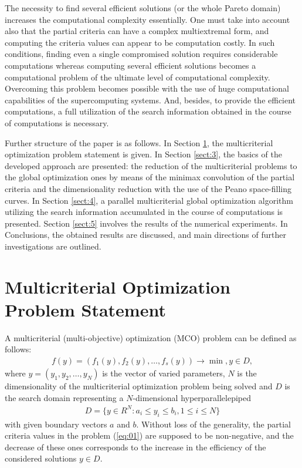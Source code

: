 \documentclass[procedia]{easychair}
\begin{document}
The necessity to find several efficient solutions (or the whole Pareto domain) increases the computational complexity essentially. One must take into account also that the partial criteria can have a complex multiextremal form, and computing the criteria values can appear to be computation costly. In such conditions, finding even a single compromised solution requires considerable computations whereas computing several efficient solutions becomes a computational problem of the ultimate level of computational complexity. Overcoming this problem becomes possible with the use of huge computational capabilities of the supercomputing systems. And, besides, to provide the efficient computations, a full utilization of the search information obtained in the course of computations is necessary. \par

Further structure of the paper is as follows. In Section \ref{sect:2}, the multicriterial optimization problem statement is given. In Section \ref{sect:3}, the basics of the developed approach are presented: the reduction of the multicriterial problems to the global optimization ones by means of the minimax convolution of the partial criteria and the dimensionality reduction with the use of the Peano space-filling curves. In Section \ref{sect:4}, a parallel multicriterial global optimization algorithm utilizing the search information accumulated in the course of computations is presented. Section \ref{sect:5} involves the results of the numerical experiments. In Conclusions, the obtained results are discussed, and main directions of further investigations are outlined.


\section{Multicriterial Optimization Problem Statement}
\label{sect:2}
A multicriterial (multi-objective) optimization (MCO) problem can be defined as follows:
\begin{eqnarray} \label{eq:01}
f(y) = (f_1(y), f_2(y),\dots, f_s(y)) \to \min,  y \in D,
\end{eqnarray}
where $y = (y_1, y_2, \dots , y_N)$ is the vector of varied parameters, $N$ is the dimensionality of the multicriterial optimization problem being solved and $D$ is the search domain representing a $N$-dimensional hyperparallelepiped 
\begin{eqnarray*}
D  = \{ y \in R^N: a_i \leq y_i \leq b_i, 1 \leq i \leq N \}
\end{eqnarray*}
with given boundary vectors $a$ and $b$. Without loss of the generality, the partial criteria values in the problem (\ref{eq:01}) are supposed to be non-negative, and the decrease of these ones corresponds to the increase in the efficiency of the considered solutions $y \in D$.\par
\end{document}
